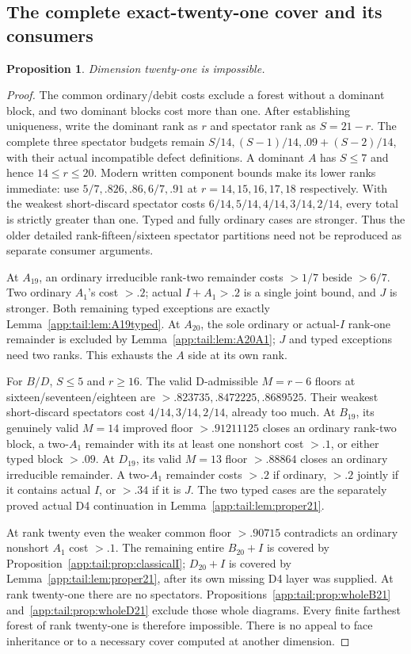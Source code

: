 \documentclass[11pt]{article}
\newtheorem{proposition}[theorem]{Proposition}
\theoremstyle{definition}
\theoremstyle{remark}
\begin{document}
\subsection{The complete exact-twenty-one cover and its consumers}
\label{app:tail:exact21}
\begin{proposition}
\label{app:tail:prop:exact21}
Dimension twenty-one is impossible.
\end{proposition}
\begin{proof}
The common ordinary/debit costs exclude a forest without a dominant
block, and two dominant blocks cost more than one. After establishing
uniqueness, write the dominant rank as $r$ and spectator rank as
$S=21-r$. The complete three spectator budgets remain
$S/14,(S-1)/14,.09+(S-2)/14$, with their actual incompatible
defect definitions. A dominant $A$ has $S\le7$ and hence
$14\le r\le20$. Modern written component bounds make its lower
ranks immediate: use $5/7,.826,.86,6/7,.91$ at
$r=14,15,16,17,18$ respectively. With the weakest short-discard
spectator costs $6/14,5/14,4/14,3/14,2/14$, every total is
strictly greater than one. Typed and fully ordinary cases are
stronger. Thus the older detailed rank-fifteen/sixteen spectator
partitions need not be reproduced as separate consumer arguments.

At $A_{19}$, an ordinary irreducible rank-two remainder costs
$>1/7$ beside $>6/7$. Two ordinary $A_1$'s cost $>.2$;
actual $I+A_1>.2$ is a single joint bound, and $J$ is stronger.
Both remaining typed exceptions are exactly
Lemma~\ref{app:tail:lem:A19typed}. At $A_{20}$, the sole
ordinary or actual-$I$ rank-one remainder is excluded by
Lemma~\ref{app:tail:lem:A20A1}; $J$ and typed exceptions need
two ranks. This exhausts the $A$ side at its own rank.

For $B/D$, $S\le5$ and $r\ge16$. The valid D-admissible
$M=r-6$ floors at sixteen/seventeen/eighteen are
$>.823735,\allowbreak .8472225,\allowbreak .8689525$. Their weakest short-discard
spectators cost $4/14,\allowbreak 3/14,\allowbreak 2/14$, already too much.
At $B_{19}$, its genuinely valid $M=14$ improved floor
$>.91211125$ closes an ordinary rank-two block, a two-$A_1$
remainder with its at least one nonshort cost $>.1$, or either
typed block $>.09$. At $D_{19}$, its valid $M=13$ floor
$>.88864$ closes an ordinary irreducible remainder. A two-$A_1$
remainder costs $>.2$ if ordinary, $>.2$ jointly if it contains
actual $I$, or $>.34$ if it is $J$. The two typed cases are
the separately proved actual D4 continuation in
Lemma~\ref{app:tail:lem:proper21}.

At rank twenty even the weaker common floor $>.90715$ contradicts
an ordinary nonshort $A_1$ cost $>.1$. The remaining entire
$B_{20}+I$ is covered by Proposition~\ref{app:tail:prop:classicalI};
$D_{20}+I$ is covered by Lemma~\ref{app:tail:lem:proper21},
after its own missing D4 layer was supplied. At rank twenty-one
there are no spectators. Propositions~\ref{app:tail:prop:wholeB21}
and~\ref{app:tail:prop:wholeD21} exclude those whole diagrams.
Every finite farthest forest of rank twenty-one is therefore
impossible. There is no appeal to face inheritance or to a
necessary cover computed at another dimension.
\end{proof}
\end{document}
